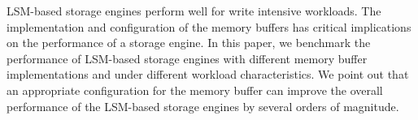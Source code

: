 LSM-based storage engines perform well for write intensive workloads. 
The implementation and configuration of the memory buffers has critical implications on the performance of a storage engine.
In this paper, we benchmark the performance of LSM-based storage engines with different memory buffer implementations and under different workload characteristics.
We point out that an appropriate configuration for the memory buffer can improve the overall performance of the LSM-based storage engines by several orders of magnitude. 
